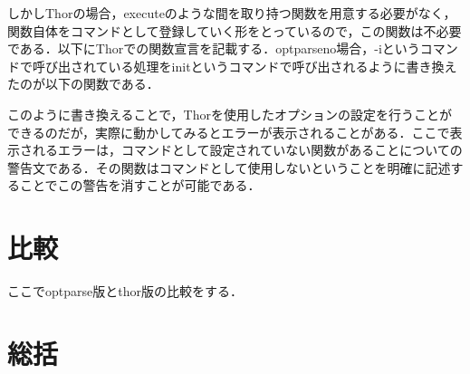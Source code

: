 しかしThorの場合，executeのような間を取り持つ関数を用意する必要がなく，関数自体をコマンドとして登録していく形をとっているので，この関数は不必要である．以下にThorでの関数宣言を記載する．optparseno場合，-iというコマンドで呼び出されている処理をinitというコマンドで呼び出されるように書き換えたのが以下の関数である．

\begin{Shaded}
\begin{Highlighting}[]
\NormalTok{, }
\NormalTok{ => }
     
\NormalTok{,}\NormalTok{)}
    \NormalTok{::}
\end{Highlighting}
\end{Shaded}

このように書き換えることで，Thorを使用したオプションの設定を行うことができるのだが，実際に動かしてみるとエラーが表示されることがある．ここで表示されるエラーは，コマンドとして設定されていない関数があることについての警告文である．その関数はコマンドとして使用しないということを明確に記述することでこの警告を消すことが可能である．

\begin{Shaded}
\begin{Highlighting}[]


\end{Highlighting}
\end{Shaded}

    \section{比較}\label{ux6bd4ux8f03}

ここでoptparse版とthor版の比較をする．

    \section{総括}\label{ux7dcfux62ec}


    
    
    
    

